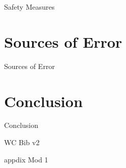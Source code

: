 \documentclass[12pt, a4paper]{article}
\begin{document}
        {Safety Measures} 
                
\section{{Sources of Error}}
        
        {Sources of Error}
        
\section{{Conclusion}}
        
        {Conclusion}
        

        
\clearpage

{WC}
{Bib v2}


\clearpage

\appendix

\appendixpage

{appdix Mod 1}
\end{document}
